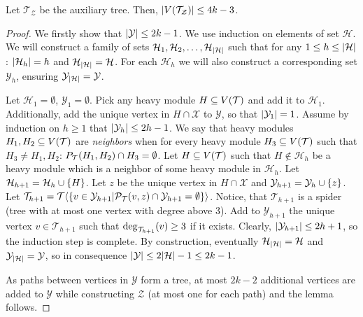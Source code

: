 \begin{lemma}\label{auxTreeSizeLemma}
    Let $\mathcal{T}_{\mathcal{Z}}$ be the auxiliary tree. Then, $\mathopen{}\left| V\mathopen{}\left( \mathcal{T}_{\mathcal{Z}} \right) \right|\leq 4k-3$.
    \begin{proof}
        We firstly show that $\mathopen{}\left| \mathcal{Y} \right|\leq 2k-1$. We use induction on elements of set $\mathcal{H}$. We will construct a family of sets $\mathcal{H}_1, \mathcal{H}_2,\dots, \mathcal{H}_{\mathopen{}\left| \mathcal{H} \right|}$ such that for any $1\leq h\leq \mathopen{}\left| \mathcal{H} \right|$: $\mathopen{}\left| \mathcal{H}_h \right|=h$ and $\mathcal{H}_{\mathopen{}\left| \mathcal{H} \right|}=\mathcal{H}$. For each $\mathcal{H}_h$ we will also construct a corresponding set $\mathcal{Y}_h$, ensuring $\mathcal{Y}_{\mathopen{}\left| \mathcal{H} \right|}=\mathcal{Y}$.
        
        Let $\mathcal{H}_1=\emptyset$, $\mathcal{Y}_1=\emptyset$. Pick any heavy module $H\subseteq V\mathopen{}\left( \mathcal{T} \right)$ and add it to $\mathcal{H}_1$. Additionally, add the unique vertex in $H\cap\mathcal{X}$ to $\mathcal{Y}$, so that $\mathopen{}\left| \mathcal{Y}_1 \right|=1$. Assume by induction on $h\geq1$ that $\mathopen{}\left| \mathcal{Y}_h \right|\leq 2h-1$. We say that heavy modules $H_1,H_2\subseteq V\mathopen{}\left( \mathcal{T} \right)$ are \textit{neighbors} when for every heavy module $H_3\subseteq V\mathopen{}\left( \mathcal{T} \right)$ such that $H_3\neq H_1,H_2$: $P_{\mathcal{T}}\mathopen{}\left( H_1,H_2 \right)\cap H_3=\emptyset$.
        Let $H\subseteq V\mathopen{}\left( \mathcal{T} \right)$ such that $H\notin \mathcal{H}_h$ be a heavy module which is a neighbor of some heavy module in $\mathcal{H}_h$. Let $\mathcal{H}_{h+1}=\mathcal{H}_h\cup\mathopen{}\left\{ H \right\}$.  Let $z$ be the unique vertex in $H\cap\mathcal{X}$ and $\mathcal{Y}_{h+1}=\mathcal{Y}_{h}\cup\mathopen{}\left\{ z \right\}$. Let $\mathcal{T}_{h+1}=\mathcal{T}\mathopen{}\langle \mathopen{}\left\{ v\in \mathcal{Y}_{h+1}|\mathcal{P}_\mathcal{T}\mathopen{}\left( v,z \right)\cap \mathcal{Y}_{h+1}=\emptyset \right\} \rangle$. Notice, that $\mathcal{T}_{h+1}$ is a spider (tree with at most one vertex with degree above 3). Add to $\mathcal{Y}_{h+1}$ the unique vertex $v\in \mathcal{T}_{h+1}$ such that $\deg_{\mathcal{T}_{h+1}}\mathopen{}\left( v \right)\geq 3$ if it exists. Clearly, $\mathopen{}\left| \mathcal{Y}_{h+1} \right|\leq2h+1$, so the induction step is complete. By construction, eventually $\mathcal{H}_{\mathopen{}\left| \mathcal{H} \right|}=\mathcal{H}$ and $\mathcal{Y}_{\mathopen{}\left| \mathcal{H} \right|}=\mathcal{Y}$, so in consequence $\mathopen{}\left| \mathcal{Y} \right|\leq 2\mathopen{}\left| \mathcal{H} \right|-1\leq 2k-1$.
        
        As paths between vertices in $\mathcal{Y}$ form a tree, at most $2k-2$ additional vertices are added to $\mathcal{Y}$ while constructing $\mathcal{Z}$ (at most one for each path) and the lemma follows.
    \end{proof}
\end{lemma}

